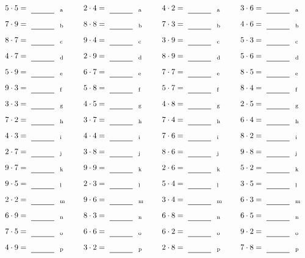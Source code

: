 \documentclass
[
  draft    = true,
  fontsize = 11pt,
  parskip  = half-
]
{scrartcl}
\begin{document}
\par\vfill\par
\begin{align*}
    \pline{5\cdot5}&=\rline{a}
  & \pline{2\cdot4}&=\rline{a}
  & \pline{4\cdot2}&=\rline{a}
  & \pline{3\cdot6}&=\rline{a} \\[1ex]
    \pline{7\cdot9}&=\rline{b}
  & \pline{8\cdot8}&=\rline{b}
  & \pline{7\cdot3}&=\rline{b}
  & \pline{4\cdot6}&=\rline{b} \\[1ex]
    \pline{8\cdot7}&=\rline{c}
  & \pline{9\cdot4}&=\rline{c}
  & \pline{3\cdot9}&=\rline{c}
  & \pline{5\cdot3}&=\rline{c} \\[1ex]
    \pline{4\cdot7}&=\rline{d}
  & \pline{2\cdot9}&=\rline{d}
  & \pline{8\cdot9}&=\rline{d}
  & \pline{5\cdot6}&=\rline{d} \\[1ex]
    \pline{5\cdot9}&=\rline{e}
  & \pline{6\cdot7}&=\rline{e}
  & \pline{7\cdot7}&=\rline{e}
  & \pline{8\cdot5}&=\rline{e} \\[1ex]
    \pline{9\cdot3}&=\rline{f}
  & \pline{5\cdot8}&=\rline{f}
  & \pline{5\cdot7}&=\rline{f}
  & \pline{8\cdot4}&=\rline{f} \\[1ex]
    \pline{3\cdot3}&=\rline{g}
  & \pline{4\cdot5}&=\rline{g}
  & \pline{4\cdot8}&=\rline{g}
  & \pline{2\cdot5}&=\rline{g} \\[1ex]
    \pline{7\cdot2}&=\rline{h}
  & \pline{3\cdot7}&=\rline{h}
  & \pline{7\cdot4}&=\rline{h}
  & \pline{6\cdot4}&=\rline{h} \\[1ex]
    \pline{4\cdot3}&=\rline{i}
  & \pline{4\cdot4}&=\rline{i}
  & \pline{7\cdot6}&=\rline{i}
  & \pline{8\cdot2}&=\rline{i} \\[1ex]
    \pline{2\cdot7}&=\rline{j}
  & \pline{3\cdot8}&=\rline{j}
  & \pline{8\cdot6}&=\rline{j}
  & \pline{9\cdot8}&=\rline{j} \\[1ex]
    \pline{9\cdot7}&=\rline{k}
  & \pline{9\cdot9}&=\rline{k}
  & \pline{2\cdot6}&=\rline{k}
  & \pline{5\cdot2}&=\rline{k} \\[1ex]
    \pline{9\cdot5}&=\rline{l}
  & \pline{2\cdot3}&=\rline{l}
  & \pline{5\cdot4}&=\rline{l}
  & \pline{3\cdot5}&=\rline{l} \\[1ex]
    \pline{2\cdot2}&=\rline{m}
  & \pline{9\cdot6}&=\rline{m}
  & \pline{3\cdot4}&=\rline{m}
  & \pline{6\cdot3}&=\rline{m} \\[1ex]
    \pline{6\cdot9}&=\rline{n}
  & \pline{8\cdot3}&=\rline{n}
  & \pline{6\cdot8}&=\rline{n}
  & \pline{6\cdot5}&=\rline{n} \\[1ex]
    \pline{7\cdot5}&=\rline{o}
  & \pline{6\cdot6}&=\rline{o}
  & \pline{6\cdot2}&=\rline{o}
  & \pline{9\cdot2}&=\rline{o} \\[1ex]
    \pline{4\cdot9}&=\rline{p}
  & \pline{3\cdot2}&=\rline{p}
  & \pline{2\cdot8}&=\rline{p}
  & \pline{7\cdot8}&=\rline{p}
\end{align*}
\end{document}
